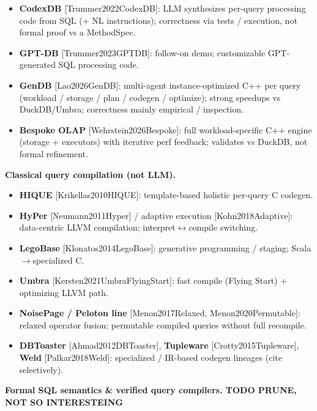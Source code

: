 \documentclass[
  10pt,
]{article}
\providecommand{\tightlist}{%
  \setlength{\itemsep}{0pt}\setlength{\parskip}{0pt}}
\begin{document}
\begin{itemize}
\tightlist
\item
  \textbf{CodexDB} {[}Trummer2022CodexDB{]}: LLM synthesizes per-query
  processing code from SQL (+ NL instructions); correctness via tests /
  execution, not formal proof vs a MethodSpec.
\item
  \textbf{GPT-DB} {[}Trummer2023GPTDB{]}: follow-on demo; customizable
  GPT-generated SQL processing code.
\item
  \textbf{GenDB} {[}Lao2026GenDB{]}: multi-agent instance-optimized C++
  per query (workload / storage / plan / codegen / optimize); strong
  speedups vs DuckDB/Umbra; correctness mainly empirical / inspection.
\item
  \textbf{Bespoke OLAP} {[}Wehrstein2026Bespoke{]}: full
  workload-specific C++ engine (storage + executors) with iterative perf
  feedback; validates vs DuckDB, not formal refinement.
\end{itemize}

\textbf{Classical query compilation (not LLM).}

\begin{itemize}
\tightlist
\item
  \textbf{HIQUE} {[}Krikellas2010HIQUE{]}: template-based holistic
  per-query C codegen.
\item
  \textbf{HyPer} {[}Neumann2011Hyper{]} / adaptive execution
  {[}Kohn2018Adaptive{]}: data-centric LLVM compilation;
  interpret\ensuremath{\leftrightarrow}compile switching.
\item
  \textbf{LegoBase} {[}Klonatos2014LegoBase{]}: generative programming /
  staging; Scala\ensuremath{\rightarrow}specialized C.
\item
  \textbf{Umbra} {[}Kersten2021UmbraFlyingStart{]}: fast compile (Flying
  Start) + optimizing LLVM path.
\item
  \textbf{NoisePage / Peloton line} {[}Menon2017Relaxed,
  Menon2020Permutable{]}: relaxed operator fusion; permutable compiled
  queries without full recompile.
\item
  \textbf{DBToaster} {[}Ahmad2012DBToaster{]}, \textbf{Tupleware}
  {[}Crotty2015Tupleware{]}, \textbf{Weld} {[}Palkar2018Weld{]}:
  specialized / IR-based codegen lineages (cite selectively).
\end{itemize}

\textbf{Formal SQL semantics \& verified query compilers. TODO PRUNE,
NOT SO INTERESTEING}
\end{document}
